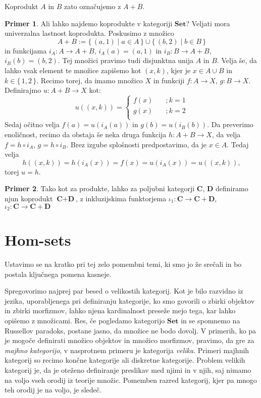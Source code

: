 \documentclass[12pt,a4paper]{book}
\theoremstyle{definition}
\theoremstyle{plain}
\theoremstyle{definition}
\newtheorem{primer}{Primer}[section]
\theoremstyle{remark}
\newcommand{\cat}[1]{\textbf{#1}}
\renewcommand{\set}[1]{\{\,#1\,\}}
\begin{document}
Koprodukt $A$ in $B$ zato označujemo z $A + B$.
\begin{primer}
Ali lahko najdemo koprodukte v kategoriji $\cat{Set}$? 
Veljati mora univerzalna lastnost koprodukta.
Poskusimo z množico 
$$A+B := \set{(a,1) \mid a \in A} \cup \set{(b,2) \mid b \in B}$$
in funkcijama $i_A : A \to A + B$, $i_A(a) = (a,1)$ in $i_B : B \to A+B$, $i_B(b) = (b,2)$. Tej množici pravimo tudi disjunktna unija $A$ in $B$. Velja še, da lahko vsak element te množice zapišemo kot $(x,k)$, kjer je $x \in A \cup B$ in $k \in \set{1,2}$. Recimo torej, da imamo množico $X$ in funkciji $f : A \to X$, $g: B \to X$. Definirajmo $u: A+B \to X$ kot:
\[
u((x,k)) = 
	\begin{cases}
		f(x) &\quad ;k = 1 \\
		g(x) &\quad ;k = 2 \\
	\end{cases}
\]
Sedaj očitno velja $f(a) = u(i_A(a))$ in $g(b) = u(i_B(b))$. Da preverimo enoličnost, recimo da obstaja še neka druga funkcija $h : A+B \to X$, da velja $f = h \circ i_A$, $g = h \circ i_B$. Brez izgube splošnosti predpostavimo, da je $x \in A$. Tedaj velja
$$h((x,k)) = h(i_A(x)) = f(x) = u(i_A(x)) = u((x,k)),$$
torej $u = h$.
\end{primer}

\begin{primer}
Tako kot za produkte, lahko za poljubni kategorji $\cat{C}$, $\cat{D}$ definiramo njun koprodukt $\cat{C} + \cat{D}$, z inkluzijskima funktorjema $\iota_1 : \cat{C} \to \cat{C} + \cat{D}$, $\iota_2 : \cat{C} \to \cat{C} + \cat{D}$
\end{primer}

\section{Hom-sets}
Ustavimo se na kratko pri tej zelo pomembni temi, ki smo jo že srečali in bo postala ključnega pomena kasneje.


Spregovorimo najprej par besed o velikostih kategorij. Kot je bilo razvidno iz jezika, uporabljenega pri definiranju kategorije, ko smo govorili o zbirki objektov in zbirki morfizmov, lahko njena kardinalnost preseže mejo tega, kar lahko opišemo z množicami. Res, če pogledamo kategorijo $\cat{Set}$ in se spomnemo na Russellov paradoks, postane jasno, da množice ne bodo dovolj. V primerih, ko pa je mogoče definirati množico objektov in množico morfizmov, pravimo, da gre za \emph{majhno kategorijo}, v nasprotnem primeru je kategorija \emph{velika}. Primeri majhnih kategorij so recimo končne kategorije ali diskretne kategorije. Problem velikih kategorij je, da je oteženo definiranje preslikav med njimi in v njih, saj nimamo na voljo vseh orodij iz teorije množic. Pomemben razred kategorij, kjer pa mnogo teh orodij je na voljo, je sledeč.
\end{document}
